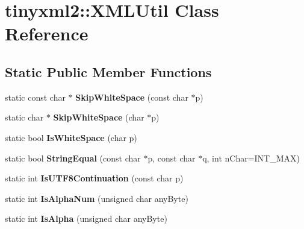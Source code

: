 \hypertarget{classtinyxml2_1_1XMLUtil}{}\section{tinyxml2\+:\+:X\+M\+L\+Util Class Reference}
\label{classtinyxml2_1_1XMLUtil}
\subsection*{Static Public Member Functions}
\begin{DoxyCompactItemize}
\item 
\mbox{\label{classtinyxml2_1_1XMLUtil_a9333d20f2a34325b5115ca45849c4b2a}} 
static const char $\ast$ {\bfseries Skip\+White\+Space} (const char $\ast$p)
\item 
\mbox{\label{classtinyxml2_1_1XMLUtil_aa48025be8843ec5a79b65579d31bd8fc}} 
static char $\ast$ {\bfseries Skip\+White\+Space} (char $\ast$p)
\item 
\mbox{\label{classtinyxml2_1_1XMLUtil_a357ec3af8fc433d19023a815f45e8e33}} 
static bool {\bfseries Is\+White\+Space} (char p)
\item 
\mbox{\label{classtinyxml2_1_1XMLUtil_acfcd287cacfd2533e1bc9ea4dfb56602}} 
static bool {\bfseries String\+Equal} (const char $\ast$p, const char $\ast$q, int n\+Char=I\+N\+T\+\_\+\+M\+AX)
\item 
\mbox{\label{classtinyxml2_1_1XMLUtil_a24ba87b1d22528167a3d16c4f52096bf}} 
static int {\bfseries Is\+U\+T\+F8\+Continuation} (const char p)
\item 
\mbox{\label{classtinyxml2_1_1XMLUtil_ac921fe9ab2ddefe073ed9eed5108ffe6}} 
static int {\bfseries Is\+Alpha\+Num} (unsigned char any\+Byte)
\item 
\mbox{\label{classtinyxml2_1_1XMLUtil_a102c0ecacf6e728b118e82d2b70ab49d}} 
static int {\bfseries Is\+Alpha} (unsigned char any\+Byte)
\item 
\mbox{\label{classtinyxml2_1_1XMLUtil_ae9bcb2bc3cd6475fdc644c8c17790555}} 

\end{DoxyCompactItemize}
